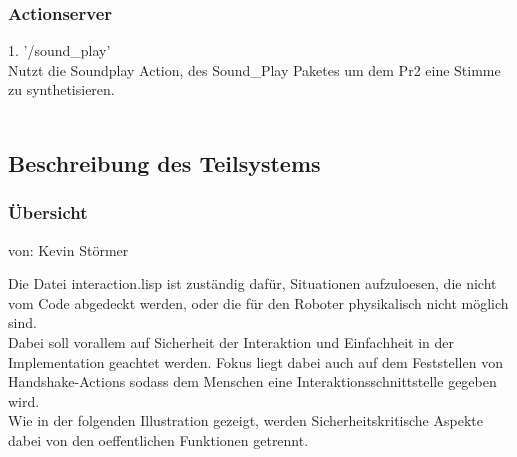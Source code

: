 \documentclass{suturo}
\makeatletter
\newcommand{\chapterauthor}[1]{%
  {\parindent0pt\vspace*{-27pt}%
  \linespread{0}\small\begin{flushright}von: #1\end{flushright}%
  \par\nobreak\vspace*{0pt}}
  \@afterheading%
}
\makeatother
\begin{document}
\subsubsection{Actionserver}
1. '/sound\_play' \\
Nutzt die Soundplay Action, des Sound\_Play Paketes um dem Pr2 eine Stimme zu synthetisieren.\\ \\
\subsection{Beschreibung des Teilsystems}
\subsubsection{\"Ubersicht}
\chapterauthor{Kevin Störmer}
Die Datei interaction.lisp ist zuständig dafür, Situationen aufzuloesen, die nicht vom Code abgedeckt werden, oder die für den Roboter physikalisch nicht möglich sind.\\
Dabei soll vorallem auf Sicherheit der Interaktion und Einfachheit in der Implementation geachtet werden. Fokus liegt dabei auch auf dem Feststellen von Handshake-Actions sodass dem Menschen eine Interaktionsschnittstelle gegeben wird.\\
Wie in der folgenden Illustration gezeigt, werden Sicherheitskritische Aspekte dabei von den oeffentlichen Funktionen getrennt.
\begin{figure}[!htb]
\end{figure}
\end{document}
